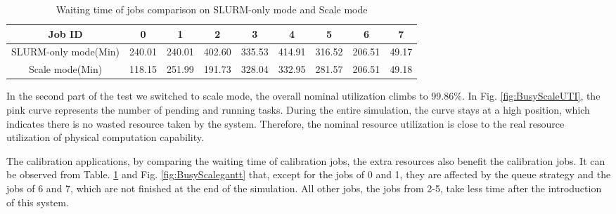 \begin{table}[]
    \centering
    \begin{tabular}{ccccccccc}
    \hline
    Job ID         & 0      & 1      & 2      & 3      & 4      & 5      & 6      & 7     \\
    \hline
    SLURM-only mode(Min)   & 240.01 & 240.01 & 402.60 & 335.53 & 414.91 & 316.52 & 206.51 & 49.17 \\
    Scale mode(Min) & 118.15 & 251.99 & 191.73 & 328.04 & 332.95 & 281.57 & 206.51 & 49.18
    \end{tabular}
    \caption{Waiting time of jobs comparison on SLURM-only mode and Scale mode}
    \label{tab:waittimecomparison}
\end{table}
In the second part of the test we switched to scale mode, the overall nominal utilization climbs to 99.86\%. 
In Fig. \ref{fig:BusyScaleUTI}, the pink curve represents the number of pending and running tasks.
During the entire simulation, the curve stays at a high position, which indicates there is no wasted resource taken by the system.
Therefore, the nominal resource utilization is close to the real resource utilization of physical computation capability.

The calibration applications, by comparing the waiting time of calibration jobs, the extra resources also benefit the calibration jobs.
It can be observed from  Table. \ref{tab:waittimecomparison} and Fig. \ref{fig:BusyScalegantt} that, except for the jobs of 0 and 1, they are affected by the queue strategy and the jobs of 6 and 7, which are not finished at the end of the simulation. 
All other jobs, the jobs from 2-5, take less time after the introduction of this system.

